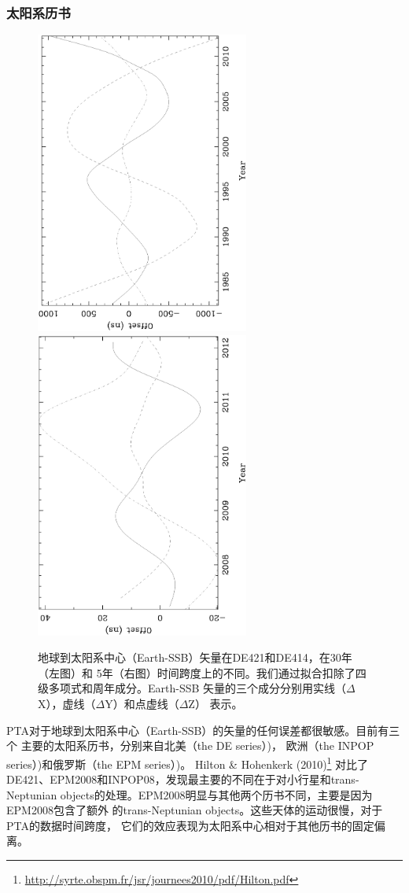 \subsubsection{太阳系历书}
\begin{figure}
\includegraphics[angle=-90,width=7cm]{ephem1.ps}
\includegraphics[angle=-90,width=7cm]{ephem2.ps}
\caption{地球到太阳系中心（Earth-SSB）矢量在DE421和DE414，在30年（左图）和
5年（右图）时间跨度上的不同。我们通过拟合扣除了四级多项式和周年成分。Earth-SSB
矢量的三个成分分别用实线（$\Delta$X），虚线（$\Delta$Y）和点虚线（$\Delta$Z）
表示。} 
\label{fg:ephDiff}
\end{figure}

PTA对于地球到太阳系中心（Earth-SSB）的矢量的任何误差都很敏感。目前有三个
主要的太阳系历书，分别来自北美（the DE series）\supercite{nsw83})，
欧洲（the INPOP series）\supercite{fmlg08})和俄罗斯（the EPM series）\supercite{pit05})。
Hilton \& Hohenkerk (2010)\footnote{\url{http://syrte.obspm.fr/jsr/journees2010/pdf/Hilton.pdf}}
对比了DE421、EPM2008和INPOP08，发现最主要的不同在于对小行星和trans-Neptunian 
objects的处理。EPM2008明显与其他两个历书不同，主要是因为EPM2008包含了额外
的trans-Neptunian objects。这些天体的运动很慢，对于PTA的数据时间跨度，
它们的效应表现为太阳系中心相对于其他历书的固定偏离。

